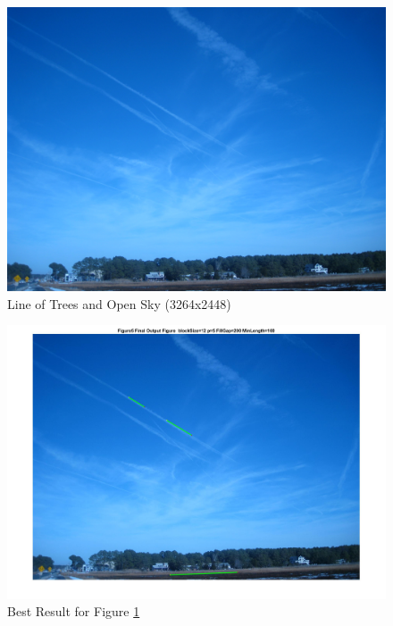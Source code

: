 \begin{figure}[htb!]
\centering
\includegraphics[width=6in]{pic/figure5.jpg}
\caption{Line of Trees and Open Sky (3264x2448)}
\label{figure5}
\end{figure}

\begin{figure}[hbtp]
	\centering
	\includegraphics[width=6in]{pic/Figure5_best.jpg}
	\caption{Best Result for Figure \ref{figure5}}
	\label{Figure5_best}
\end{figure}


